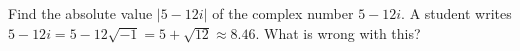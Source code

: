 Find the absolute value $|5-12i|$ of the complex number $5-12i$. A student writes $5-12i=5-12\sqrt{-1}=5+\sqrt{12}\approx8.46$. What is wrong with this?
